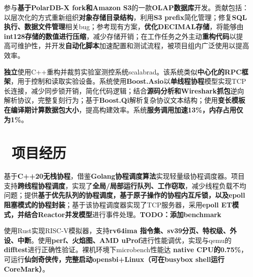 \documentclass{resume}
\begin{document}

\begin{spacing}{1.125}
  参与\textbf{基于PolarDB-X fork和Amazon S3}的一款\textbf{OLAP数据库}开发。贡献包括：以层次化的方式重新组织\textbf{对象存储目录结构}，利用\textbf{S3 prefix}简化管理；修复\textbf{SQL执行、数据文件管理}相关bug；参考现有方案，\textbf{优化DECIMAL存储}，将能够由\textbf{int128存储的数值进行压缩}，减少存储开销；在工作任务之外主动\textbf{重构代码}以提高可维护性，并开发\textbf{自动化脚本}加速配置和测试流程，被项目组内广泛使用以提高效率。
\end{spacing}

\begin{spacing}{1.125}
  \textbf{独立}使用C++重构并裁剪实验室测控系统scalabrad。该系统类似\textbf{中心化的RPC框架}，用于控制和读取实验设备。系统使用\textbf{Boost.Asio}以\textbf{单线程协程}模型实现TCP长连接，减少同步锁开销，简化代码逻辑；结合\textbf{源码分析和Wireshark抓包}逆向解析协议，完整复刻行为；基于\textbf{Boost.Qi}解析复杂协议文本结构；使用\textbf{变长模板在编译期计算数据包大小}，提高构建效率。系统\textbf{服务调用加速13\%，内存占用仅为1\%}。
\end{spacing}

\section{\faCogs\ 项目经历}


\begin{spacing}{1.125}
  基于\textbf{C++20无栈协程}，借鉴\textbf{Golang协程调度算法}实现轻量级协程调度器。项目支持\textbf{跨线程协程调度}，实现了\textbf{全局/局部运行队列、工作窃取}，减少线程负载不均问题；提供\textbf{基于优先队列的协程调度，基于原子操作的协程内互斥锁，以及epoll阻塞模式的协程封装}；基于该协程调度器实现了TCP服务器，采用\textbf{epoll ET模式，并结合Reactor并发模型}进行事件处理。\textbf{TODO：添加benchmark}
\end{spacing}

\begin{spacing}{1.125}
  使用Rust实现RISC-V模拟器，支持\textbf{rv64ima 指令集、sv39分页、特权级、外设、中断}。使用\textbf{perf、火焰图、AMD uProf}进行性能调优，实现与qemu的\textbf{difftest}进行正确性验证。裸机环境下microbench性能达 \textbf{native CPU的0.75\%}，可运行\textbf{仙剑奇侠传，完整启动opensbi+Linux（可在busybox shell运行CoreMark）}。

\end{spacing}
\end{document}
